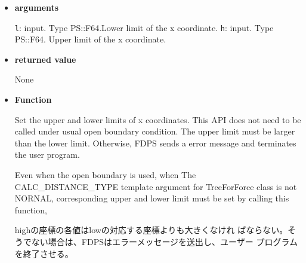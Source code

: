 \begin{itemize}

\item {\bf arguments}

{\tt l}: input. Type PS::F64.Lower limit of the x coordinate.
{\tt h}: input. Type PS::F64. Upper limit of the x coordinate.


\item {\bf returned value}

None

\item {\bf Function}

Set the upper and lower limits of x coordinates.  This API does
not need to be called under usual open boundary condition. The upper
limit must be larger than the lower limit. Otherwise, FDPS sends a error message and terminates
the user program.


Even when the open boundary is used, when
The CALC\_DISTANCE\_TYPE template argument for TreeForForce class is
not  NORNAL, corresponding upper and lower limit must be set by
calling this function,





highの座標の各値はlowの対応する座標よりも大きくなけれ
ばならない。そうでない場合は、FDPSはエラーメッセージを送出し、ユーザー
プログラムを終了させる。









\end{itemize}

